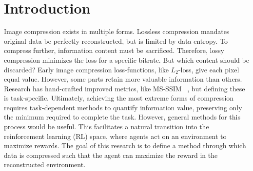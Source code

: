 \section{Introduction}
Image compression exists in multiple forms. Lossless compression mandates original data be perfectly reconstructed, but is limited by data entropy. To compress further, information content must be sacrificed. Therefore, lossy compression minimizes the loss for a specific bitrate. But which content should be discarded? Early image compression loss-functions, like $L_2$-loss, give each pixel equal value. However, some parts retain more valuable information than others. Research has hand-crafted improved metrics, like MS-SSIM ~\cite{1292216}, but defining these is task-specific. Ultimately, achieving the most extreme forms of compression requires task-dependent methods to quantify information value, preserving only the minimum required to complete the task. However, general methods for this process would be useful. This facilitates a natural transition into the reinforcement learning (RL) space, where agents act on an environment to maximize rewards. The goal of this research is to define a method through which data is compressed such that the agent can maximize the reward in the reconstructed environment.
